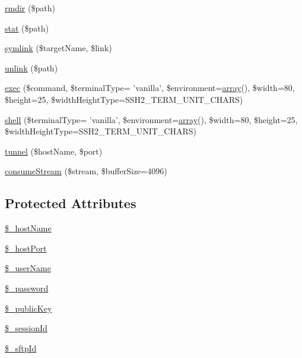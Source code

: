 \begin{DoxyCompactItemize}
\item 
\hyperlink{classCPSSsh_a5c2fb19d078f1905ecd5988d7add2c9b}{rmdir} (\$path)
\item 
\hyperlink{classCPSSsh_a893a92915f20d637be8bcee4201900a5}{stat} (\$path)
\item 
\hyperlink{classCPSSsh_aec3e3319826b954ee04ec148bb8fff4d}{symlink} (\$targetName, \$link)
\item 
\hyperlink{classCPSSsh_ad6244fc254de2b00ab567e4e0b82a4b3}{unlink} (\$path)
\item 
\hyperlink{classCPSSsh_a6b3ea2d54c7397714777048290fd851c}{exec} (\$command, \$terminalType= 'vanilla', \$environment=\hyperlink{list_8php_aa3205d038c7f8feb5c9f01ac4dfadc88}{array}(), \$width=80, \$height=25, \$widthHeightType=SSH2\_\-TERM\_\-UNIT\_\-CHARS)
\item 
\hyperlink{classCPSSsh_a815c67fbeee1b1a6db7000511efee19b}{shell} (\$terminalType= 'vanilla', \$environment=\hyperlink{list_8php_aa3205d038c7f8feb5c9f01ac4dfadc88}{array}(), \$width=80, \$height=25, \$widthHeightType=SSH2\_\-TERM\_\-UNIT\_\-CHARS)
\item 
\hyperlink{classCPSSsh_a4706216d9b34d9c5a0e249764d01d8f9}{tunnel} (\$hostName, \$port)
\item 
\hyperlink{classCPSSsh_aee459d6c2cffbcb4ebf75a2880b19c11}{consumeStream} (\$stream, \$bufferSize=4096)
\end{DoxyCompactItemize}
\subsection*{Protected Attributes}
\begin{DoxyCompactItemize}
\item 
\hyperlink{classCPSSsh_aea4d2182573f32e00024b6d3ab307669}{\$\_\-hostName}
\item 
\hyperlink{classCPSSsh_a7144786d61ff1e88b8599df72eef589a}{\$\_\-hostPort}
\item 
\hyperlink{classCPSSsh_adad05d8340094323803ec5acd86329a1}{\$\_\-userName}
\item 
\hyperlink{classCPSSsh_ab2d9cec4126c2a36b45c4e24bccc0be7}{\$\_\-password}
\item 
\hyperlink{classCPSSsh_aa75ed584b43a95e58e9d1a173036a6f8}{\$\_\-publicKey}
\item 
\hyperlink{classCPSSsh_a7ee516ff732b630349455f5c9f9c85a8}{\$\_\-sessionId}
\item 
\hyperlink{classCPSSsh_ae9e1f0a5c641603ae7ed3388ae8a2368}{\$\_\-sftpId}
\end{DoxyCompactItemize}


